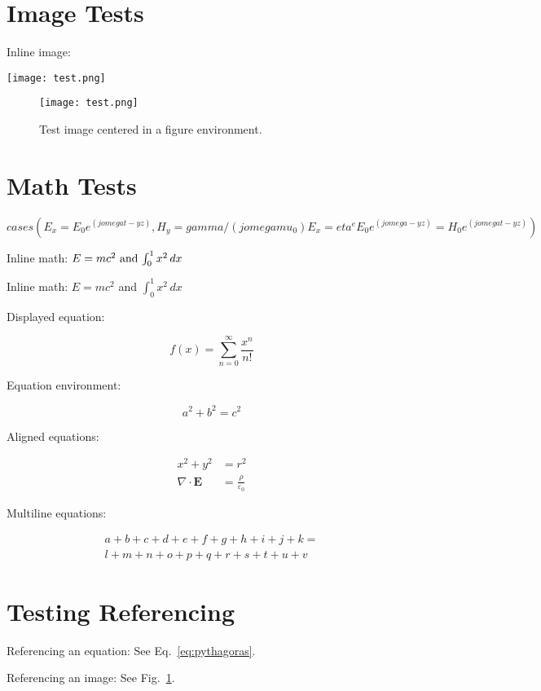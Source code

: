 \documentclass{article}
\begin{document}
\section{Image Tests}

Inline image:

\texttt{[image: test.png]}

\begin{figure}[h]
    \centering
    \texttt{[image: test.png]}
    \caption{Test image centered in a figure environment.}
    \label{fig:test_image}
\end{figure}

\newpage


\section{Math Tests}


$
  cases(
  E_x = E_0 e^(j omega t - y z),
  H_y = gamma / (j omega mu_0) E_x = eta^e E_0 e^(j omega - y z) = H_0 e^(j omega t - y z)
 )
$

Inline math: \(E=mc^2$ and $\int_0^1 x^2 \,dx\)

Inline math: $E=mc^2$ and $\int_0^1 x^2 \,dx$

Displayed equation:

\[
    f(x) = \sum_{n=0}^{\infty} \frac{x^n}{n!}
\]

Equation environment:

\begin{equation}
    a^2 + b^2 = c^2
    \label{eq:pythagoras}
\end{equation}

Aligned equations:

\begin{align}
    x^2 + y^2 &= r^2 \\
    \nabla \cdot \mathbf{E} &= \frac{\rho}{\varepsilon_0}
\end{align}

Multiline equations:

\begin{multline}
    a + b + c + d + e + f + g + h + i + j + k = \\
    l + m + n + o + p + q + r + s + t + u + v
\end{multline}

\newpage

\section{Testing Referencing}

Referencing an equation: See Eq.~\ref{eq:pythagoras}.

Referencing an image: See Fig.~\ref{fig:test_image}.
\end{document}
